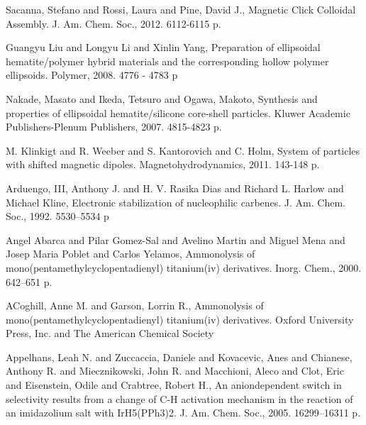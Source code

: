 \documentclass[a4paper,14pt]{extarticle}
\begin{document}
    \begingroup
    \renewcommand{\section}[2]{}%
    \begin{thebibliography}{99}

        Sacanna, Stefano and Rossi, Laura and Pine, David J., Magnetic Click Colloidal Assembly. J. Am. Chem. Soc., 2012. 6112-6115 p.

        Guangyu Liu and Longyu Li and Xinlin Yang, Preparation of ellipsoidal hematite/polymer hybrid materials and the corresponding hollow polymer ellipsoids. Polymer, 2008. 4776 - 4783 p

        Nakade, Masato and Ikeda, Tetsuro and Ogawa, Makoto, Synthesis and properties of ellipsoidal hematite/silicone core-shell particles. Kluwer Academic Publishers-Plenum Publishers, 2007. 4815-4823 p.

        M. Klinkigt and R. Weeber and S. Kantorovich and C. Holm, System of particles with shifted magnetic dipoles. Magnetohydrodynamics, 2011. 143-148 p.

        Arduengo, III, Anthony J. and H. V. Rasika Dias and Richard L. Harlow and Michael Kline, Electronic stabilization of nucleophilic carbenes. J. Am. Chem. Soc., 1992. 5530–5534 p

        Angel Abarca and Pilar Gomez-Sal and Avelino Martin and Miguel Mena and Josep Maria Poblet and Carlos Yelamos, Ammonolysis of mono(pentamethylcyclopentadienyl) titanium(iv) derivatives. Inorg. Chem., 2000. 642–651 p.

        ACoghill, Anne M. and Garson, Lorrin R., Ammonolysis of mono(pentamethylcyclopentadienyl) titanium(iv) derivatives. Oxford University Press, Inc. and The American Chemical Society

        Appelhans, Leah N. and Zuccaccia, Daniele and Kovacevic, Anes and Chianese, Anthony R. and Miecznikowski, John R. and Macchioni, Aleco and Clot, Eric and Eisenstein, Odile and Crabtree, Robert H., An aniondependent switch in selectivity results from a change of C-H activation mechanism in the reaction of an imidazolium salt with IrH5(PPh3)2. J. Am. Chem. Soc., 2005. 16299–16311 p.


\end{thebibliography}
\end{document}

